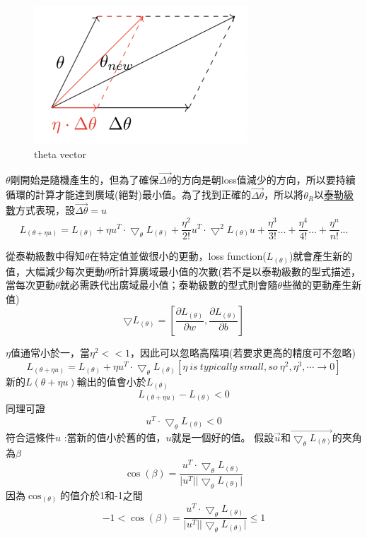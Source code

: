 \documentclass[13pt, a4paper]{report}
\begin{document}
\begin{figure}[hbt!]
\center
\includegraphics[width=8cm]{theta_vector}
\caption{theta vector \href{https://hackernoon.com/the-reason-behind-moving-in-the-direction-opposite-to-the-gradient-f9566b95370b}{\faLink}}
\label{Fig.theta_vector} 
\end{figure}

$\theta$剛開始是隨機產生的，但為了確保$\overrightarrow{\Delta\theta}$的方向是朝loss值減少的方向，所以要持續循環的計算才能達到廣域(絕對)最小值。為了找到正確的$\overrightarrow{\Delta\theta}$，所以將$\theta_{R}$以\href{https://youtu.be/3d6DsjIBzJ4}{\underline{泰勒級數}}方式表現，設$\overrightarrow{\Delta\theta}=u$
$$L_{(\theta+\eta u)}=L_{(\theta)}+\eta u^{T}\cdot\bigtriangledown_{\theta} L_{(\theta)}+\frac{\eta^2}{2!}u^T\cdot\bigtriangledown^2 L_{(\theta)}u+\frac{\eta^3}{3!}...+\frac{\eta^4}{4!}...+\frac{\eta^n}{n!}...$$


從泰勒級數中得知$\theta$在特定值並做很小的更動，loss function($L_{(\theta)}$)就會產生新的值，大幅減少每次更動$\theta$所計算廣域最小值的次數(若不是以泰勒級數的型式描述，當每次更動$\theta$就必需跌代出廣域最小值；泰勒級數的型式則會隨$\theta$些微的更動產生新值)
$$\bigtriangledown L_{(\theta)}=[\frac{\partial L_{(\theta)}}{\partial w}, \frac{\partial L_{(\theta)}}{\partial b}]$$


$\eta$值通常小於一，當$\eta ^2<<1$，因此可以忽略高階項(若要求更高的精度可不忽略)
$$L_{(\theta+\eta u)}=L_{(\theta)}+\eta u^{T}\cdot\bigtriangledown_{\theta} L_{(\theta)} [\eta\ is\ typically\ small, so\ \eta^2, \eta^3,\cdots \rightarrow 0]$$
新的$L(\theta+\eta u)$輸出的值會小於$L_{(\theta)}$
$$L_{(\theta+\eta u)}-L_{(\theta)}<0$$
同理可證
$$u^{T}\cdot\bigtriangledown_{\theta} L_{(\theta)}<0$$
符合這條件$u$ :當新的值小於舊的值，$u$就是一個好的值。
假設$\overrightarrow{u}$和$\overrightarrow{\bigtriangledown_{\theta} L_{(\theta)}}$的夾角為$\beta$ \href{https://www.khanacademy.org/math/linear-algebra/vectors-and-spaces/dot-cross-products/v/vector-dot-product-and-vector-length}{\faLink}
$$\cos(\beta)=\frac{u^{T}\cdot\bigtriangledown_{\theta} L_{(\theta)}}{\vert u^{T}\vert\vert \bigtriangledown_{\theta} L_{(\theta)}\vert}$$
因為$\cos_{(\theta)}$的值介於1和-1之間
$$-1<\cos(\beta)=\frac{u^{T}\cdot\bigtriangledown_{\theta} L_{(\theta)}}{\vert u^{T}\vert\vert \bigtriangledown_{\theta} L_{(\theta)}\vert}\leq 1$$
\end{document}
